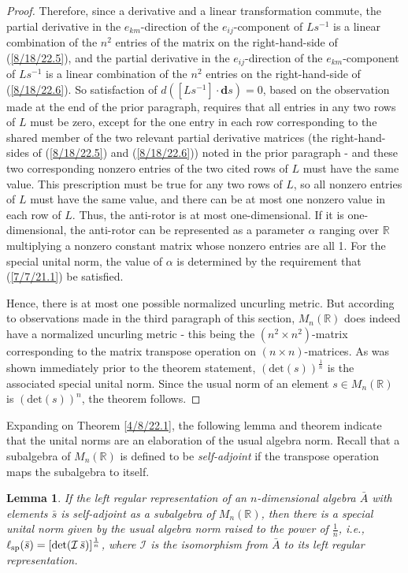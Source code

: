 \documentclass{amsart}
\numberwithin{equation}{section}
\newtheorem{lemma}[theorem]{Lemma}
\theoremstyle{definition}
\numberwithin{theorem}{section}
\begin{document}
\begin{proof}
Therefore, since a derivative and a linear transformation commute, the partial derivative in the $e_{km}$-direction of the $e_{ij}$-component of $Ls^{-1}$ is a linear combination of the $n^2$ entries of the matrix on the right-hand-side of (\ref{8/18/22.5}), and  the partial derivative in the $e_{ij}$-direction of the $e_{km}$-component of $Ls^{-1}$ is a linear combination of the $n^2$ entries on the right-hand-side of (\ref{8/18/22.6}).
So satisfaction of \mbox{$d\left([Ls^{-1}]\cdot \mathbf{d}s\right) = 0$,} based on the observation made at the end of the prior paragraph, requires that all entries in any two rows of $L$ must be zero, except for the one entry in each row corresponding to the shared member of the two relevant partial derivative matrices (the right-hand-sides of (\ref{8/18/22.5}) and (\ref{8/18/22.6})) noted in the prior paragraph - and these two corresponding nonzero entries of the two cited rows of $L$ must have the same value.  This prescription must be true for any two rows of $L$, so all nonzero entries of $L$ must have the same value, and there can be at most one nonzero value in each row of $L$.  Thus, the anti-rotor is at most one-dimensional. If it is one-dimensional, the anti-rotor can be represented as a parameter $\alpha$ ranging over $\mathbb{R}$ multiplying a nonzero constant matrix whose nonzero entries are all 1.  
For the special unital norm, the value of $\alpha$ is determined by the requirement that (\ref{7/7/21.1}) be satisfied. 


Hence, there is at most one possible normalized uncurling metric.  But according to observations made in the third paragraph of this section, $ M_n(\mathbb{R})$ does indeed have a normalized uncurling metric - this being the $(n^2\times n^2)$-matrix corresponding to the matrix transpose operation on $(n\times n)$-matrices.  As was shown immediately prior to the theorem statement, $(\mbox{det}(s))^{\frac{1}{n}}$ is the associated special unital norm.  Since the usual norm of an element $s\in M_n(\mathbb{R})$ is $(\mbox{det}(s))^n$, the theorem follows.
 \end{proof}
 
 Expanding on Theorem \ref{4/8/22.1}, the following lemma and theorem indicate that the unital norms are an elaboration of the usual algebra norm.  Recall that a subalgebra of $M_n(\mathbb{R})$ is defined to be {\it self-adjoint} if the transpose operation maps the subalgebra to itself.
 
  \begin{lemma}\label{5/13/22.1} If the left regular representation of an $n$-dimensional algebra $\bar{A}$ with elements $\bar{s}$ is self-adjoint as a subalgebra of $M_n(\mathbb{R})$, then there is a special unital norm given by the usual algebra norm raised to the power of $\frac{1}{n}$, i.e., $\ell_{\rm sp}(\bar{s}) = [{\rm det}(\mathcal{I}\, \bar{s})]^\frac{1}{n}$, where $\mathcal{I}$ is the isomorphism from $\bar{A}$ to its left regular representation.
\end{lemma}
\end{document}
